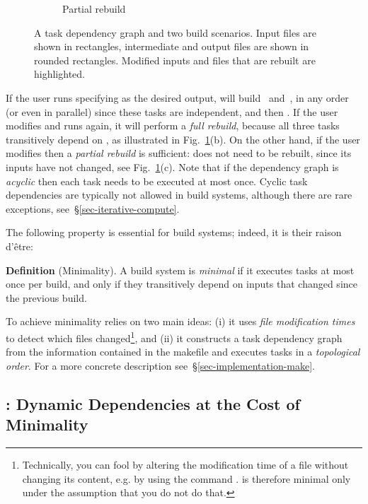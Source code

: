 \begin{figure}
\begin{subfigure}[b]{0.32\linewidth}
\caption{Partial rebuild}
\end{subfigure}
\caption{A task dependency graph and two build scenarios. Input files are shown
in rectangles, intermediate and output files are shown in rounded rectangles.
Modified inputs and files that are rebuilt are highlighted.
\label{fig-make}}
\end{figure}

If the user runs \Make specifying  as the desired output, \Make
will build~ and~, in any order (or even in parallel) since these tasks are
independent, and then . If the user modifies  and runs
\Make again, it will perform a \emph{full rebuild}, because all three tasks
transitively depend on , as illustrated in Fig.~\ref{fig-make}(b).
On the other hand, if the user modifies  then a \emph{partial
rebuild} is sufficient:  does not need to be rebuilt, since its
inputs have not changed, see Fig.~\ref{fig-make}(c). Note that if the dependency
graph is \emph{acyclic} then each task needs to be executed at most once. Cyclic
task dependencies are typically not allowed in build systems, although there are rare
exceptions, see~\S\ref{sec-iterative-compute}.

\noindent
The following property is essential for build systems; indeed, it is their
raison d'\^etre:

\vspace{2mm}
\textbf{Definition} (Minimality). A build system is \emph{minimal} if it
executes tasks at most once per build, and only if they transitively depend on
inputs that changed since the previous build.\label{def-minimal}
\vspace{2mm}

To achieve minimality \Make relies on two main ideas: (i) it uses \emph{file
modification times} to detect which files changed\footnote{Technically, you
can fool \Make by altering the modification time of a file without changing its
content, e.g. by using the command . \Make is therefore minimal only
under the assumption that you do not do that.}, and (ii) it constructs a task
dependency graph from the information contained in the makefile and executes
tasks in a \emph{topological order}. For a more concrete description
see~\S\ref{sec-implementation-make}.

\subsection{\Excel: Dynamic Dependencies at the Cost of Minimality}
\label{sec-background-excel}

